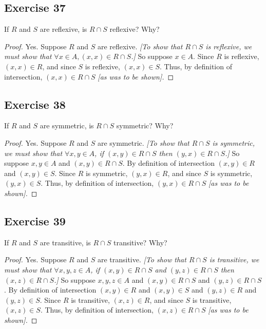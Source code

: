 \documentclass[14pt]{extarticle}
\begin{document}
\subsection{Exercise 37}
If \(R\) and \(S\) are reflexive, is \(R \cap S\) reflexive? Why?

\begin{proof}
        Yes. Suppose $R$ and $S$ are reflexive. {\it [To show that \(R \cap S\) is reflexive, we must show that \(\forall x
                                \in A, (x, x) \in R \cap S\).]} So suppose \(x \in A\). Since $R$ is reflexive, \((x, x) \in R\), and since $S$ is
        reflexive, \((x, x) \in S\). Thus, by definition of intersection, \((x, x) \in R \cap S\) {\it [as was to be shown].}
\end{proof}

\subsection{Exercise 38}
If \(R\) and \(S\) are symmetric, is \(R \cap S\) symmetric? Why?

\begin{proof}
        Yes. Suppose $R$ and $S$ are symmetric. {\it [To show that \(R \cap S\) is symmetric, we must show that \(\forall x,y
                                \in A\), if \((x, y) \in R \cap S\) then \((y, x) \in R \cap S\).]} So suppose \(x,y \in A\) and \((x, y) \in R
        \cap S\). By definition of intersection \((x, y) \in R\) and \((x,y)\in S\). Since $R$ is symmetric, \((y,x)\in R\),
        and since $S$ is symmetric, \((y, x) \in S\). Thus, by definition of intersection, \((y, x) \in R \cap S\)
        {\it [as was to be shown].}
\end{proof}

\subsection{Exercise 39}
If \(R\) and \(S\) are transitive, is \(R \cap S\) transitive? Why?

\begin{proof}
        Yes. Suppose $R$ and $S$ are transitive. {\it [To show that \(R \cap S\) is transitive, we must show that \(\forall x,y
                                ,z \in A\), if \((x, y) \in R \cap S\) and \((y, z) \in R \cap S\) then \((x, z) \in R \cap S\).]} So suppose \(x,y,z
        \in A\) and \((x, y) \in R \cap S\) and \((y, z) \in R \cap S\). By definition of intersection \((x, y) \in R\) and
        \((x,y)\in S\) and \((y, z) \in R\) and \((y,z)\in S\). Since $R$ is transitive, \((x,z)\in R\), and since $S$ is
        transitive, \((x, z) \in S\). Thus, by definition of intersection, \((x, z) \in R \cap S\) {\it [as was to be shown].}
\end{proof}
\end{document}
